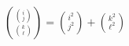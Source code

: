 \documentclass[border=8pt,12pt]{standalone}
\begin{document}
\(\displaystyle
\boxed{\binom{\binom{i}{j}}{\binom{k}{\ell}}=\binom{i^2}{j^2}+\binom{k^2}{\ell^2}}
\)
\end{document}
